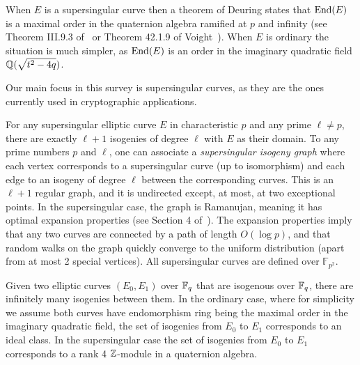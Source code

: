 When $E$ is a supersingular curve then a theorem of Deuring states that $\text{End}(E)$ is a maximal order in the quaternion algebra ramified at $p$ and infinity (see Theorem III.9.3 of~\cite{Silverman} or Theorem 42.1.9 of Voight~\cite{Voi21}).
When $E$ is ordinary the situation is much simpler, as $\text{End}(E)$ is an order in the imaginary quadratic field $\mathbb{Q}( \sqrt{t^2-4q})$.


Our main focus in this survey is supersingular curves, as they are the ones currently used in cryptographic applications.

For any supersingular elliptic curve $E$ in characteristic $p$ and any prime $\ell \ne p$, there are exactly $\ell+1$ isogenies of degree $\ell$ with $E$ as their domain. 
%
To any prime numbers $p$ and $\ell$, one can associate a \emph{supersingular isogeny graph} where each vertex corresponds to a supersingular curve (up to isomorphism) and each edge to an isogeny of degree $\ell$ between the corresponding curves. This is an $\ell+1$ regular graph, and it is undirected except, at most, at two exceptional points.
%
In the supersingular case, the graph is Ramanujan, meaning it has optimal expansion properties (see Section 4 of~\cite{CGL}). The expansion properties imply that any two curves are connected by a path of length  $O(\log p)$, and that random walks on the graph quickly converge to the uniform distribution (apart from at most 2 special vertices).
%
All supersingular curves are defined over $\mathbb{F}_{p^2}$.



Given two elliptic curves $(E_0, E_1 )$ over $
\mathbb{F}_q$ that are isogenous over $\mathbb{F}_q$, there are infinitely many isogenies between them.
In the ordinary case, where for simplicity we assume both curves have endomorphism ring being the maximal order in the imaginary quadratic field, the set of isogenies from $E_0$ to $E_1$ corresponds to an ideal class. In the supersingular case the set of isogenies from $E_0$ to $E_1$ corresponds to a rank 4 $\mathbb{Z}$-module in a quaternion algebra.


